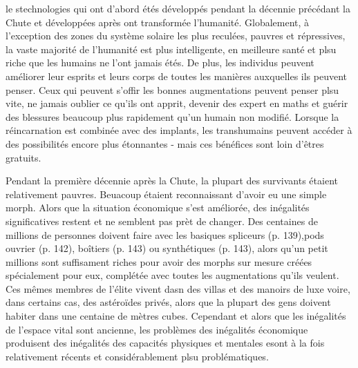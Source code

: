 le stechnologies qui ont d'abord étés développés pendant la décennie précédant la Chute et développées après ont transformée l'humanité. Globalement, à l'exception des zones du système solaire les plus reculées, pauvres et répressives, la vaste majorité de l'humanité est plus intelligente, en meilleure santé et plsu riche que les humains ne l'ont jamais étés. De plus, les individus peuvent améliorer leur esprits et leurs corps de toutes les manières auxquelles ils peuvent penser. Ceux qui peuvent s'offir les bonnes augmentations peuvent penser plsu vite, ne jamais oublier ce qu'ils ont apprit, devenir des expert en maths et guérir des blessures beaucoup plus rapidement qu'un humain non modifié. Lorsque la réincarnation est combinée avec des implants, les transhumains peuvent accéder à des possibilités encore plus étonnantes - mais ces bénéfices sont loin d'êtres gratuits. 

Pendant la première décennie après la Chute, la plupart des survivants étaient relativement pauvres. Beuacoup étaient reconnaissant d'avoir eu une simple morph. Alors que la situation économique s'est améliorée, des inégalités significatives restent et ne semblent pas prèt de changer. Des centaines de millions de personnes doivent faire avec les basiques spliceurs (p. 139),pods ouvrier (p. 142), boîtiers (p. 143) ou synthétiques (p. 143), alors qu'un petit millions sont suffisament riches pour avoir des morphs sur mesure créées spécialement pour eux, complétée avec toutes les augmentations qu'ils veulent. Ces mêmes membres de l'élite vivent dasn des villas et des manoirs de luxe voire, dans certains cas, des astéroïdes privés, alors que la plupart des gens doivent habiter dans une centaine de mètres cubes. Cependant et alors que les inégalités de l'espace vital sont ancienne, les problèmes des inégalités économique produisent des inégalités des capacités physiques et mentales esont à la fois relativement récents et considérablement plsu problématiques. 

